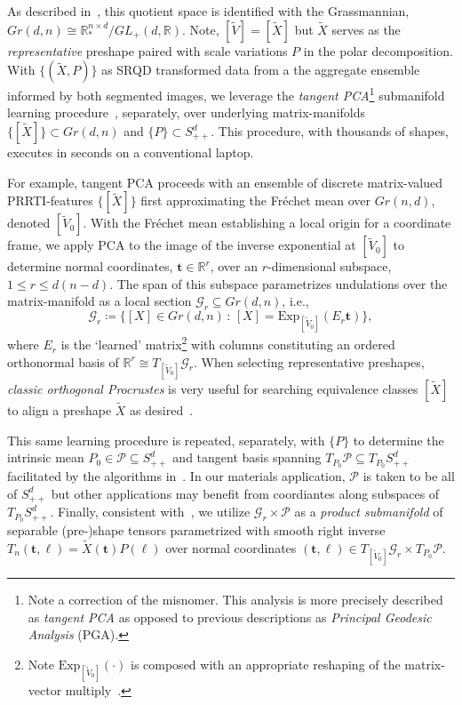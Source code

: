 \documentclass[pdflatex,iicol]{sn-jnl}%
\theoremstyle{thmstyleone}%
\theoremstyle{thmstyletwo}%
\theoremstyle{thmstylethree}%
\begin{document}
As described in~\cite{absil2008optimization}, this quotient space is identified with the Grassmannian, $Gr(d,n) \cong \mathbb{R}^{n \times d}_*/GL_+(d, \mathbb{R})$. Note, $[\widetilde{V}] = [\widetilde{X}]$ but $\widetilde{X}$ serves as the \textit{representative} preshape paired with scale variations $P$ in the polar decomposition. With $\lbrace (\widetilde{X}, P)\rbrace$ as SRQD transformed data from a the aggregate ensemble informed by both segmented images, we leverage the \textit{tangent PCA}\footnote{Note a correction of the misnomer. This analysis is more precisely described as \textit{tangent PCA} as opposed to previous descriptions as \textit{Principal Geodesic Analysis} (PGA).} submanifold learning procedure~\cite{grey2023separable,fletcher2004principal}, separately, over underlying matrix-manifolds $\lbrace [\widetilde{X}] \rbrace \subset Gr(d,n)$ and $\lbrace P \rbrace \subset S^d_{++}$.  This procedure, with thousands of shapes, executes in seconds on a conventional laptop.

For example, tangent PCA proceeds with an ensemble of discrete matrix-valued PRRTI-features $\lbrace [\widetilde{X}] \rbrace$ first approximating the Fr\'echet mean over $Gr(n,d)$, denoted $[\widetilde{V}_0]$. With the Fr\'echet mean establishing a local origin for a coordinate frame, we apply PCA to the image of the inverse exponential at $[\widetilde{V}_0]$ to determine normal coordinates, $\boldsymbol{t}\in \mathbb{R}^r$, over an $r$-dimensional subspace, $1\leq r\leq d(n-d)$. The span of this subspace parametrizes undulations over the matrix-manifold as a local section $\mathcal{G}_r \subseteq Gr(d,n)$, i.e.,
\begin{equation}
    \mathcal{G}_r \coloneqq \lbrace [X] \in Gr(d,n) \,:\, [X] = \text{Exp}_{[\widetilde{V}_0]}(E_r\boldsymbol{t}) \rbrace,
\end{equation}
where $E_r$ is the `learned' matrix\footnote{Note $\text{Exp}_{[\widetilde{V}_0]}(\cdot)$ is composed with an appropriate reshaping of the matrix-vector multiply~\cite{grey2023separable}.} with columns constituting an ordered orthonormal basis of $\mathbb{R}^r \cong T_{[\widetilde{V}_0]}\mathcal{G}_r$. When selecting representative preshapes, \textit{classic orthogonal Procrustes} is very useful for searching equivalence classes $[\widetilde{X}]$ to align a preshape $\widetilde{X}$ as desired~\cite{grey2023separable}.

This same learning procedure is repeated, separately, with $\lbrace P \rbrace$ to determine the intrinsic mean $P_0 \in \mathcal{P} \subseteq S^d_{++}$ and tangent basis spanning $T_{P_0}\mathcal{P} \subseteq T_{P_0}S^d_{++}$ facilitated by the algorithms in~\cite{fletcher2003statistics}. In our materials application, $\mathcal{P}$ is taken to be all of $S^d_{++}$ but other applications may benefit from coordiantes along subspaces of $T_{P_0}S^d_{++}$. Finally, consistent with~\cite{grey2023separable}, we utilize $\mathcal{G}_r \times \mathcal{P}$ as a \emph{product submanifold} of separable (pre-)shape tensors parametrized with smooth right inverse $T_n(\boldsymbol{t},\boldsymbol{\ell}) = \widetilde{X}(\boldsymbol{t})P(\boldsymbol{\ell})$ over normal coordinates $(\boldsymbol{t},\boldsymbol{\ell}) \in T_{[\widetilde{V}_0]}\mathcal{G}_r \times T_{P_0}\mathcal{P}$.
\end{document}
